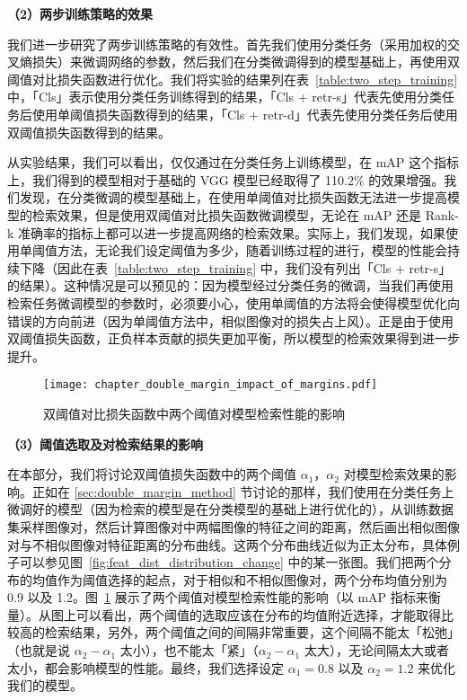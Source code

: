 \textbf{（2）两步训练策略的效果}

我们进一步研究了两步训练策略的有效性。首先我们使用分类任务（采用加权的交叉熵损失）来微调网络的参数，然后我们在分类微调得到的模型基础上，再使用双阈值对比损失函数进行优化。我们将实验的结果列在表~\ref{table:two_step_training} 中，「Cls」表示使用分类任务训练得到的结果，「Cls + retr-s」代表先使用分类任务后使用单阈值损失函数得到的结果，「Cls + retr-d」代表先使用分类任务后使用双阈值损失函数得到的结果。

从实验结果，我们可以看出，仅仅通过在分类任务上训练模型，在 mAP 这个指标上，我们得到的模型相对于基础的 VGG 模型已经取得了 110.2\% 的效果增强。我们发现，在分类微调的模型基础上，在使用单阈值对比损失函数无法进一步提高模型的检索效果，但是使用双阈值对比损失函数微调模型，无论在 mAP 还是 Rank-k 准确率的指标上都可以进一步提高网络的检索效果。实际上，我们发现，如果使用单阈值方法，无论我们设定阈值为多少，随着训练过程的进行，模型的性能会持续下降（因此在表~\ref{table:two_step_training} 中，我们没有列出「Cls + retr-s」的结果）。这种情况是可以预见的：因为模型经过分类任务的微调，当我们再使用检索任务微调模型的参数时，必须要小心，使用单阈值的方法将会使得模型优化向错误的方向前进（因为单阈值方法中，相似图像对的损失占上风）。正是由于使用双阈值损失函数，正负样本贡献的损失更加平衡，所以模型的检索效果得到进一步提升。

\begin{figure}[t]
	\centering
	\texttt{[image: chapter\_double\_margin\_impact\_of\_margins.pdf]}
	\caption{双阈值对比损失函数中两个阈值对模型检索性能的影响}
	\label{fig:impact_of_margins}
\end{figure}

\textbf{（3）阈值选取及对检索结果的影响}

在本部分，我们将讨论双阈值损失函数中的两个阈值 $\alpha_1$，$\alpha_2$ 对模型检索效果的影响。正如在 \ref{sec:double_margin_method} 节讨论的那样，我们使用在分类任务上微调好的模型（因为检索的模型是在分类模型的基础上进行优化的），从训练数据集采样图像对，然后计算图像对中两幅图像的特征之间的距离，然后画出相似图像对与不相似图像对特征距离的分布曲线。这两个分布曲线近似为正太分布，具体例子可以参见图~\ref{fig:feat_dist_distribution_change} 中的某一张图。我们把两个分布的均值作为阈值选择的起点，对于相似和不相似图像对，两个分布均值分别为 0.9 以及 1.2。图~\ref{fig:impact_of_margins} 展示了两个阈值对模型检索性能的影响（以 mAP 指标来衡量）。从图上可以看出，两个阈值的选取应该在分布的均值附近选择，才能取得比较高的检索结果，另外，两个阈值之间的间隔非常重要，这个间隔不能太「松弛」（也就是说 $\alpha_2 - \alpha_1$ 太小），也不能太「紧」（$\alpha_2 - \alpha_1$ 太大），无论间隔太大或者太小，都会影响模型的性能。最终，我们选择设定 $\alpha_1=0.8$ 以及 $\alpha_2=1.2$ 来优化我们的模型。

